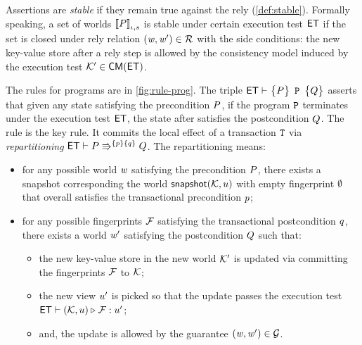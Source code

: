 Assertions are \emph{stable} if they remain true against the rely (\cref{def:stable}).
Formally speaking, a set of worlds \( \left\llbracket P \right\rrbracket_{\iota, s} \) is stable under certain execution test \( \mathsf{ET} \) if the set is closed under rely relation \( (\mathit{w}, \mathit{w}') \in {\mathcal R} \) with the side conditions:
the new key-value store after a rely step is allowed by the consistency model induced by the execution test \( \mathcal{K}' \in \mathsf{CM}(\mathsf{ET}) \).

The rules for programs are in \cref{fig:rule-prog}.
The triple \( \tripleG{\gpre}{\prog}{\gpost} \) asserts that given any state satisfying the precondition \( P \), if the program \( \mathtt{P} \) terminates under the execution test \( \mathsf{ET} \), the state after satisfies the postcondition \( Q \).
The  rule is the key rule.
It commits the local effect of a transaction \( \mathtt{T} \) via \emph{repartitioning} \( \mathsf{ET} \vdash P \Rrightarrow^{ \left\{ p \right\} \left\{ q \right\} } Q \).
The repartitioning means:
\begin{itemize}
\item
for any possible world \( \mathit{w} \) satisfying the precondition \( P \), there exists a snapshot corresponding the world \( \mathsf{snapshot}(\mathcal{K}, u) \) with empty fingerprint \( \emptyset \) that overall satisfies the transactional precondition \( p \);
\item
for any possible fingerprints  \( \mathcal{F} \) satisfying the transactional postcondition \( q \), there exists a world \( \mathit{w}' \) satisfying the postcondition \( Q \) such that:
\begin{itemize}
\item 
the new key-value store in the new world \( \mathcal{K}' \) is updated via committing the fingerprints \( \mathcal{F} \) to \( \mathcal{K} \);
\item
the new view \( u' \) is picked so that the update passes the execution test \( \mathsf{ET} \vdash (\mathcal{K},u) \triangleright_{} \mathcal{F} : u' \);
\item
and, the update is allowed by the guarantee \( (\mathit{w}, \mathit{w}') \in {\mathcal G}\).
\end{itemize}
\end{itemize}


